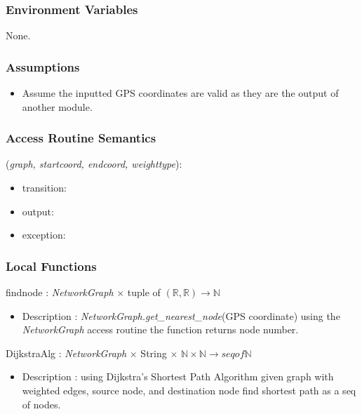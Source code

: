 \documentclass[12pt, titlepage]{article}
\begin{document}
\subsubsection{Environment Variables}

None.

\subsubsection{Assumptions}

\begin{itemize}
    \item Assume the inputted GPS coordinates are valid as they are the output of another module.
\end{itemize}

\subsubsection{Access Routine Semantics}

\noindent {}(\emph{graph, startcoord, endcoord, weighttype}):
\begin{itemize}
\item transition:  
\item output:  
\item exception:  
\end{itemize}

\subsubsection{Local Functions}

findnode : \emph{NetworkGraph} $\times$ tuple of $(\mathbb{R}, \mathbb{R})  \rightarrow \mathbb{N}$
\begin{itemize}
    \item Description : \emph{NetworkGraph.get\_nearest\_node}(GPS coordinate) using the \emph{NetworkGraph} access routine the function returns node number.
\end{itemize}
DijkstraAlg : \emph{NetworkGraph} $\times$ String $\times$ $\mathbb{N} \times \mathbb{N}  \rightarrow seq of \mathbb{N}$
\begin{itemize}
    \item Description : using Dijkstra’s Shortest Path Algorithm given graph with weighted edges, source node, and destination node find shortest path as a seq of nodes.
\end{itemize}
\newpage
\end{document}

